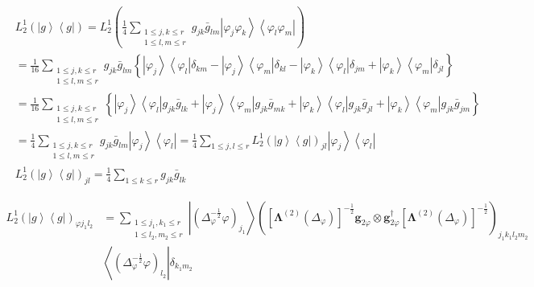 \documentclass[aps,preprint]{revtex4}%
\begin{document}
\begin{align}
&  L_{2}^{1}\left(  \left\vert g\right\rangle \left\langle g\right\vert
\right)  =L_{2}^{1}\left(  \frac{1}{4}\sum_{\substack{1\leq j,k\leq r\\1\leq
l,m\leq r}}g_{jk}\bar{g}_{lm}\left\vert \varphi_{j}\varphi_{k}\right\rangle
\left\langle \varphi_{l}\varphi_{m}\right\vert \right) \\
&  =\frac{1}{16}\sum_{\substack{1\leq j,k\leq r\\1\leq l,m\leq r}}g_{jk}%
\bar{g}_{lm}\left\{  \left\vert \varphi_{j}\right\rangle \left\langle
\varphi_{l}\right\vert \delta_{km}-\left\vert \varphi_{j}\right\rangle
\left\langle \varphi_{m}\right\vert \delta_{kl}-\left\vert \varphi
_{k}\right\rangle \left\langle \varphi_{l}\right\vert \delta_{jm}+\left\vert
\varphi_{k}\right\rangle \left\langle \varphi_{m}\right\vert \delta
_{jl}\right\} \\
&  =\frac{1}{16}\sum_{\substack{1\leq j,k\leq r\\1\leq l,m\leq r}}\left\{
\left\vert \varphi_{j}\right\rangle \left\langle \varphi_{l}\right\vert
g_{jk}\bar{g}_{lk}+\left\vert \varphi_{j}\right\rangle \left\langle
\varphi_{m}\right\vert g_{jk}\bar{g}_{mk}+\left\vert \varphi_{k}\right\rangle
\left\langle \varphi_{l}\right\vert g_{jk}\bar{g}_{jl}+\left\vert \varphi
_{k}\right\rangle \left\langle \varphi_{m}\right\vert g_{jk}\bar{g}%
_{jm}\right\} \\
&  =\frac{1}{4}\sum_{\substack{1\leq j,k\leq r\\1\leq l,m\leq r}}g_{jk}\bar
{g}_{lm}\left\vert \varphi_{j}\right\rangle \left\langle \varphi
_{l}\right\vert =\frac{1}{4}\sum_{1\leq j,l\leq r}L_{2}^{1}\left(  \left\vert
g\right\rangle \left\langle g\right\vert \right)  _{jl}\left\vert \varphi
_{j}\right\rangle \left\langle \varphi_{l}\right\vert \\
&  L_{2}^{1}\left(  \left\vert g\right\rangle \left\langle g\right\vert
\right)  _{jl}=\frac{1}{4}\sum_{1\leq k\leq r}g_{jk}\bar{g}_{lk}%
\end{align}
%

\begin{align}
L_{2}^{1}\left(  \left\vert g\right\rangle \left\langle g\right\vert \right)
_{\varphi j_{1}l_{2}}  &  =\sum_{\substack{1\leq j_{1},k_{1}\leq r\\1\leq
l_{2},m_{2}\leq r}}\left\vert \left(  \Delta_{\varphi}^{-\frac{1}{2}}%
\varphi\right)  _{j_{1}}\right\rangle \left(  \left[  \mathbf{\Lambda
}^{\left(  2\right)  }\left(  \Delta_{\varphi}\right)  \right]  ^{-\frac{1}%
{2}}\mathbf{g}_{2\varphi}\otimes\mathbf{g}_{2\varphi}^{\dagger}\left[
\mathbf{\Lambda}^{\left(  2\right)  }\left(  \Delta_{\varphi}\right)  \right]
^{-\frac{1}{2}}\right)  _{j_{1}k_{1}l_{2}m_{2}}\\
&  \left\langle \left(  \Delta_{\varphi}^{-\frac{1}{2}}\varphi\right)
_{l_{2}}\right\vert \delta_{k_{1}m_{2}}%
\end{align}
\end{document}

